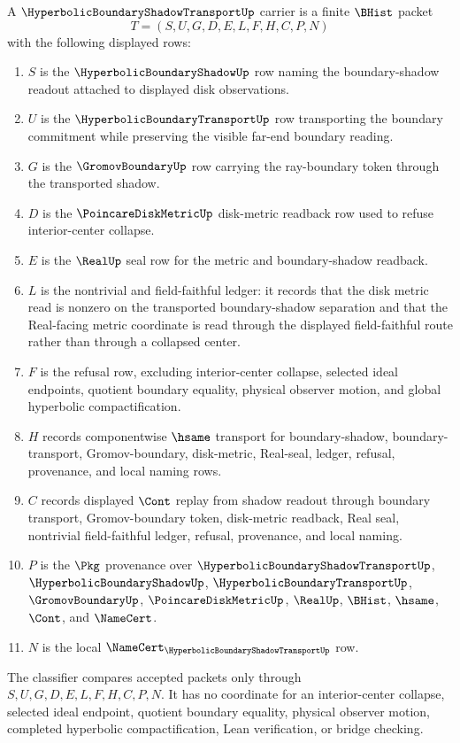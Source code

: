 \begin{definition}
\label{def:hyperbolic-boundary-shadow-transport-carrier}
A $\HyperbolicBoundaryShadowTransportUp$ carrier is a finite $\BHist$ packet
$$
T=(S,U,G,D,E,L,F,H,C,P,N)
$$
with the following displayed rows:
\begin{enumerate}
\item $S$ is the $\HyperbolicBoundaryShadowUp$ row naming the boundary-shadow
readout attached to displayed disk observations.
\item $U$ is the $\HyperbolicBoundaryTransportUp$ row transporting the boundary
commitment while preserving the visible far-end boundary reading.
\item $G$ is the $\GromovBoundaryUp$ row carrying the ray-boundary token through
the transported shadow.
\item $D$ is the $\PoincareDiskMetricUp$ disk-metric readback row used to refuse
interior-center collapse.
\item $E$ is the $\RealUp$ seal row for the metric and boundary-shadow readback.
\item $L$ is the nontrivial and field-faithful ledger: it records that the disk
metric read is nonzero on the transported boundary-shadow separation and that
the Real-facing metric coordinate is read through the displayed field-faithful
route rather than through a collapsed center.
\item $F$ is the refusal row, excluding interior-center collapse, selected ideal
endpoints, quotient boundary equality, physical observer motion, and global
hyperbolic compactification.
\item $H$ records componentwise $\hsame$ transport for boundary-shadow,
boundary-transport, Gromov-boundary, disk-metric, Real-seal, ledger, refusal,
provenance, and local naming rows.
\item $C$ records displayed $\Cont$ replay from shadow readout through
boundary transport, Gromov-boundary token, disk-metric readback, Real seal,
nontrivial field-faithful ledger, refusal, provenance, and local naming.
\item $P$ is the $\Pkg$ provenance over
$\HyperbolicBoundaryShadowTransportUp$, $\HyperbolicBoundaryShadowUp$,
$\HyperbolicBoundaryTransportUp$, $\GromovBoundaryUp$,
$\PoincareDiskMetricUp$, $\RealUp$, $\BHist$, $\hsame$, $\Cont$, and
$\NameCert$.
\item $N$ is the local $\NameCert_{\HyperbolicBoundaryShadowTransportUp}$ row.
\end{enumerate}
The classifier compares accepted packets only through
$S,U,G,D,E,L,F,H,C,P,N$. It has no coordinate for an interior-center collapse,
selected ideal endpoint, quotient boundary equality, physical observer motion,
completed hyperbolic compactification, Lean verification, or bridge checking.
\end{definition}

